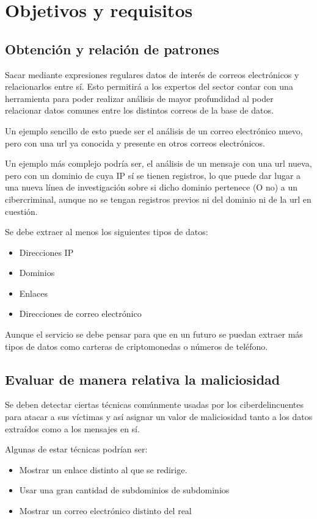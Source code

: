 \chapter{Objetivos y requisitos}\label{objetivos}
\section{Obtención y relación de patrones}
Sacar mediante expresiones regulares datos de interés de correos electrónicos y relacionarlos entre sí. Esto permitirá a los expertos del sector contar con una herramienta para poder realizar análisis de mayor profundidad al poder relacionar datos comunes entre los distintos correos de la base de datos. 

Un ejemplo sencillo de esto puede ser el análisis de un correo electrónico nuevo, pero con una url ya conocida y presente en otros correos electrónicos. 

Un ejemplo más complejo podría ser, el análisis de un mensaje con una url nueva, pero con un dominio de cuya IP sí se tienen registros, lo que puede dar lugar a una nueva línea de investigación sobre si dicho dominio pertenece (O no) a un cibercriminal, aunque no se tengan registros previos ni del dominio ni de la url en cuestión. 

Se debe extraer al menos los siguientes tipos de datos:
\begin{itemize}
    \item Direcciones IP
    \item Dominios
    \item Enlaces
    \item Direcciones de correo electrónico
\end{itemize}

Aunque el servicio se debe pensar para que en un futuro se puedan extraer más tipos de datos como carteras de criptomonedas o números de teléfono.

\section{Evaluar de manera relativa la maliciosidad}
Se deben detectar ciertas técnicas comúnmente usadas por los ciberdelincuentes para atacar a sus víctimas y así asignar un valor de maliciosidad tanto a los datos extraídos como a los mensajes en sí. 

Algunas de estar técnicas podrían ser: 
\begin{itemize}
    \item Mostrar un enlace distinto al que se redirige.
    \item Usar una gran cantidad de subdominios de subdominios
    \item Mostrar un correo electrónico distinto del real
\end{itemize}

